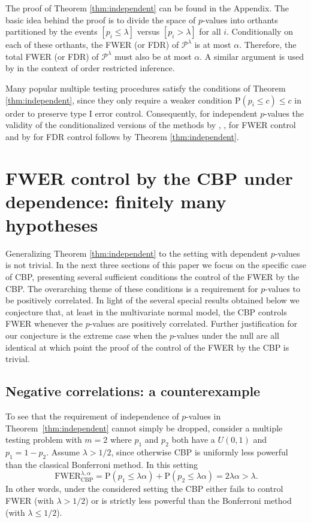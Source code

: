 \documentclass {imsart}
\newcommand{\SUD}{$U(0,1)$\xspace}
\newcommand{\FWERcb}{\mathrm{FWER}_{\mathrm{CBP}}^{\lambda,\alpha}}
\newcommand{\Plam}{\mathcal{P}^\lambda}
\begin{document}
The proof of Theorem \ref{thm:independent} can be found in the Appendix. The basic idea behind the proof is to divide the space of $p$-values into orthants partitioned by the events ${[{p_i}\leq\lambda ]}$ versus ${[{p_i} > \lambda ]} $ for all $i$. Conditionally on each of these orthants, the FWER (or FDR) of $\Plam$ is at most $\alpha $. Therefore, the total FWER (or FDR) of $\Plam$ must also be at most $\alpha$. A similar argument is used by \citet{WD1986} in the context of order restricted inference.

Many popular multiple testing procedures satisfy the conditions of Theorem \ref{thm:independent}, since they only require a weaker condition $\mathrm{P}(p_i{}\leq{}c)\leq{}c$ in order to preserve type I error control. Consequently, for independent $p$-values the validity of the conditionalized versions of the methods by \cite{Holm1979}, \cite{Hommel1988}, \cite{Hochberg1988} for FWER control and by \cite{BH1995} for FDR control follows by Theorem \ref{thm:independent}.





\section{FWER control by the CBP under dependence: finitely many hypotheses}

Generalizing Theorem \ref{thm:independent} to the setting with dependent $p$-values is not trivial. In the next three sections of this paper we focus on the specific case of CBP, presenting several sufficient conditions the control of the FWER by the CBP. The overarching theme of these conditions is a requirement for $p$-values to be positively correlated. In light of the several special results obtained below we conjecture that, at least in the multivariate normal model, the CBP controls FWER whenever the $p$-values are positively correlated. Further justification for our conjecture is the extreme case when the $p$-values under the null are all identical at which point the proof of the control of the FWER by the CBP is trivial.

\subsection{Negative correlations: a counterexample}

To see that the requirement of independence of $p$-values in Theorem~\ref{thm:independent} cannot simply be dropped, consider a multiple testing problem with $m=2$ where $p_1$ and $p_2$ both have a \SUD and $p_1=1-p_2$. Assume $\lambda > 1/2$, since otherwise CBP is uniformly less powerful than the classical Bonferroni method. In this setting
\[
\FWERcb=\mathrm{P}(p_1\leq\lambda\alpha)+\mathrm{P}(p_2\leq\lambda\alpha)=2\lambda\alpha>\lambda.
\]
In other words, under the considered setting the CBP either fails to control FWER (with $\lambda>1/2$) or is strictly less powerful than the Bonferroni method (with $\lambda\leq1/2$).
\end{document}
